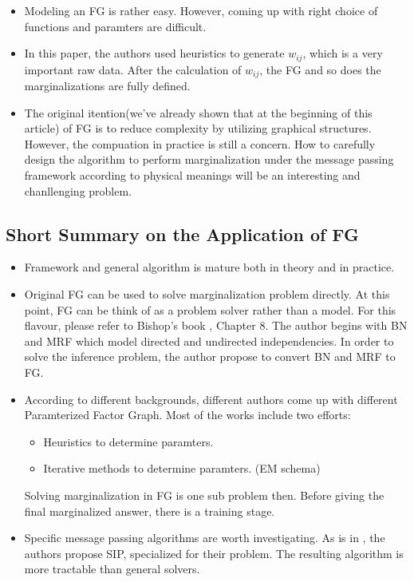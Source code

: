 \begin{itemize}
	\item Modeling an FG is rather easy. However, coming up with 
	right choice of functions and paramters are difficult. 
	\item In this paper, the authors used heuristics to generate 
	$w_{ij}$, which is a very important raw data. After the calculation 
	of $w_{ij}$, the FG and so does the marginalizations are fully defined. 
	\item The original itention(we've already shown that at the beginning
	of this article) of FG is to reduce complexity by utilizing graphical 
	structures. However, the compuation in practice is still a concern. 
	How to carefully design the algorithm to perform marginalization 
	under the message passing framework according to physical 
	meanings will be an interesting and chanllenging problem.   
\end{itemize}

\subsection{Short Summary on the Application of FG}

\begin{itemize}
	\item Framework and general algorithm is mature both in 
	theory and in practice. 
	\item Original FG can be used to solve marginalization problem 
	directly. At this point, FG can be think of as a problem solver
	rather than a model. For this flavour, please refer to Bishop's book
	\cite{bishop2006pattern}, Chapter 8. The author begins with 
	BN and MRF which model directed and undirected independencies. 
	In order to solve the inference problem, the author propose to 
	convert BN and MRF to FG. 
	\item According to different backgrounds, different authors 
	come up with different Paramterized Factor Graph. 
	Most of the works include two efforts: 
		\begin{itemize}
			\item Heuristics to determine paramters. 
			\item Iterative methods to determine paramters. 
			(EM schema)
		\end{itemize}			
	Solving marginalization in FG is one sub problem then. Before
	giving the final marginalized answer, there is a training stage. 
	\item Specific message passing algorithms are worth investigating. 
	As is in \cite{wang2011-dynamic}, the authors propose SIP, specialized 
	for their problem. The resulting algorithm is more tractable than 
	general solvers. 
\end{itemize}

